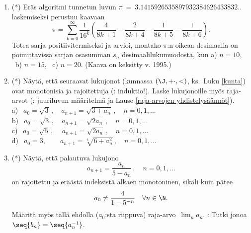 \begin{enumerate}
\item (*)
Eräs algoritmi tunnetun luvun $\pi\ =\ 3.1415926535897932384626433832..$ laskemiseksi
perustuu kaavaan
\[
\pi=\sum_{k=0}^\infty \frac{1}{16^k}
    \left(\frac{4}{8k+1}-\frac{2}{8k+4}-\frac{1}{8k+5}-\frac{1}{8k+6}\right).
\]
Totea sarja positiivitermiseksi ja arvioi, montako $\pi$:n oikeaa desimaalia on 
poimittavissa sarjan osasumman $s_n$ desimaalilukumuodosta, kun a) $n=10$, \ b) $n=15$, \ 
c) $n=20$. (Kaava on keksitty v. 1995.)

\item (*) \label{H-I-8: sqrt-kunta}
Näytä, että seuraavat lukujonot (kunnassa $(\J,+\cdot,<)$, ks.\ Luku \ref{kunta})
ovat monotonisia ja rajoitettuja (: induktio!). Laske lukujonoille myös raja-arvot
(\kor{vihje}: juuriluvun määritelmä ja Lause \ref{raja-arvojen yhdistelysäännöt}). \\[2mm]
a) $\ \ a_0=\sqrt{3}\,, \quad   a_{n+1}=\sqrt{3+a_n}\,,      \quad n=0,1, \ldots$ \\[2mm]
b) $\ \ a_0=\sqrt{3}\,, \quad   a_{n+1}=\sqrt{2a_n}\,,       \quad n=0,1, \ldots$ \\[2mm]
c) $\ \ a_0=\sqrt{5}\,, \quad\, a_{n+1}=\sqrt{2a_n}\,,       \quad n=0,1, \ldots$ \\[2mm]
d) $\ \ a_0=3,          \qquad  a_{n+1}=\sqrt[4]{6+a_n^2}\,, \quad n=0,1, \ldots$  

\item (*)
Näytä, että palautuva lukujono
\[
a_{n+1} = \frac{a_n}{5-a_n}\,, \quad n=0,1, \ldots
\]
on rajoitettu ja eräästä indeksistä alkaen monotoninen, sikäli kuin pätee
\[
a_0 \neq \frac{4}{1-5^{-n}} \quad \forall n\in\N.
\]
Määritä myös tällä ehdolla ($a_0$:sta riippuva) raja-arvo $\,\lim_n a_n$. \newline
\kor{Vihje}: Tutki jonoa $\seq{b_n}=\seq{a_n^{-1}}$. 

\end{enumerate} 
